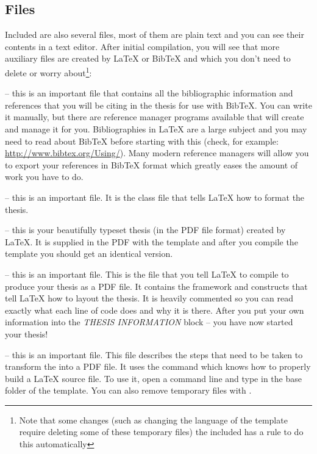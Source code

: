 \subsection{Files}

Included are also several files, most of them are plain text and you can see their contents in a text editor. After initial compilation, you will see that more auxiliary files are created by \LaTeX{} or BibTeX and which you don't need to delete or worry about\footnote{Note that some changes (such as changing the language of the template require deleting some of these temporary files) the included  has a  rule to do this automatically}:

 -- this is an important file that contains all the bibliographic information and references that you will be citing in the thesis for use with BibTeX. You can write it manually, but there are reference manager programs available that will create and manage it for you. Bibliographies in \LaTeX{} are a large subject and you may need to read about BibTeX before starting with this (check, for example: \url{http://www.bibtex.org/Using/}). Many modern reference managers will allow you to export your references in BibTeX format which greatly eases the amount of work you have to do.

 -- this is an important file. It is the class file that tells \LaTeX{} how to format the thesis. 

 -- this is your beautifully typeset thesis (in the PDF file format) created by \LaTeX{}. It is supplied in the PDF with the template and after you compile the template you should get an identical version.

 -- this is an important file. This is the file that you tell \LaTeX{} to compile to produce your thesis as a PDF file. It contains the framework and constructs that tell \LaTeX{} how to layout the thesis. It is heavily commented so you can read exactly what each line of code does and why it is there. After you put your own information into the \emph{THESIS INFORMATION} block -- you have now started your thesis!

 -- this is an important file. This file describes the steps that need to be taken to transform the  into a PDF file. It uses the command  which knows how to properly build a \LaTeX{} source file. To use it, open a command line and type  in the base folder of the template. You can also remove temporary files with . 

